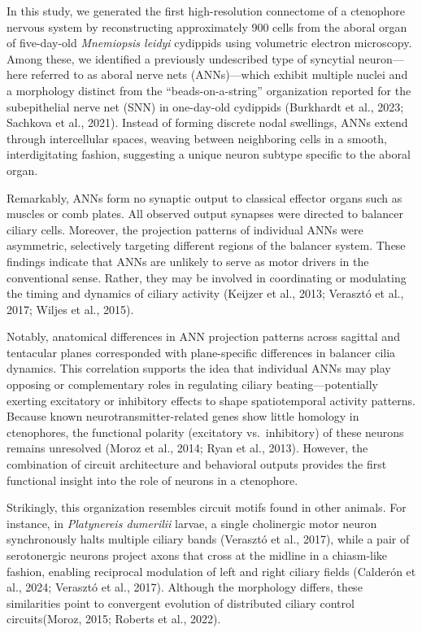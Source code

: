 \documentclass[
  11pt,
]{article}
\begin{document}
In this study, we generated the first high-resolution connectome of a
ctenophore nervous system by reconstructing approximately 900 cells from
the aboral organ of five-day-old \emph{Mnemiopsis leidyi} cydippids
using volumetric electron microscopy. Among these, we identified a
previously undescribed type of syncytial neuron---here referred to as
aboral nerve nets (ANNs)---which exhibit multiple nuclei and a
morphology distinct from the ``beads-on-a-string'' organization reported
for the subepithelial nerve net (SNN) in one-day-old cydippids
(Burkhardt et al., 2023; Sachkova et al., 2021). Instead of forming
discrete nodal swellings, ANNs extend through intercellular spaces,
weaving between neighboring cells in a smooth, interdigitating fashion,
suggesting a unique neuron subtype specific to the aboral organ.

Remarkably, ANNs form no synaptic output to classical effector organs
such as muscles or comb plates. All observed output synapses were
directed to balancer ciliary cells. Moreover, the projection patterns of
individual ANNs were asymmetric, selectively targeting different regions
of the balancer system. These findings indicate that ANNs are unlikely
to serve as motor drivers in the conventional sense. Rather, they may be
involved in coordinating or modulating the timing and dynamics of
ciliary activity (Keijzer et al., 2013; Verasztó et al., 2017; Wiljes et
al., 2015).

Notably, anatomical differences in ANN projection patterns across
sagittal and tentacular planes corresponded with plane-specific
differences in balancer cilia dynamics. This correlation supports the
idea that individual ANNs may play opposing or complementary roles in
regulating ciliary beating---potentially exerting excitatory or
inhibitory effects to shape spatiotemporal activity patterns. Because
known neurotransmitter-related genes show little homology in
ctenophores, the functional polarity (excitatory vs.~inhibitory) of
these neurons remains unresolved (Moroz et al., 2014; Ryan et al.,
2013). However, the combination of circuit architecture and behavioral
outputs provides the first functional insight into the role of neurons
in a ctenophore.

Strikingly, this organization resembles circuit motifs found in other
animals. For instance, in \emph{Platynereis dumerilii} larvae, a single
cholinergic motor neuron synchronously halts multiple ciliary bands
(Verasztó et al., 2017), while a pair of serotonergic neurons project
axons that cross at the midline in a chiasm-like fashion, enabling
reciprocal modulation of left and right ciliary fields (Calderón et al.,
2024; Verasztó et al., 2017). Although the morphology differs, these
similarities point to convergent evolution of distributed ciliary
control circuits(Moroz, 2015; Roberts et al., 2022).
\end{document}
